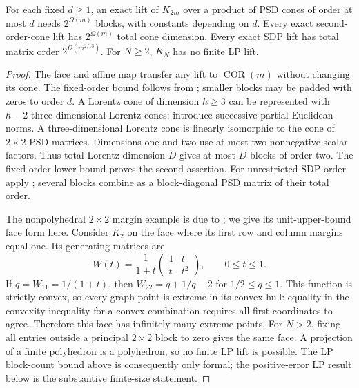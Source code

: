 \begin{corollary}\label{app:exact-conic}
For each fixed $d\ge1$, an exact lift of $K_{2m}$ over a product of
PSD cones of order at most $d$ needs $2^{\Omega(m)}$ blocks, with
constants depending on $d$. Every exact second-order-cone lift has
$2^{\Omega(m)}$ total cone dimension. Every exact SDP lift has total
matrix order $2^{\Omega(m^{2/13})}$. For $N\ge2$, $K_N$ has no finite
LP lift.
\end{corollary}
\begin{proof}
The face and affine map transfer any lift to $\operatorname{COR}(m)$
without changing its cone. The fixed-order bound follows from
\citet[Theorem~1]{s6:fawzi2013}; smaller blocks may be padded with
zeros to order $d$. A Lorentz cone of dimension $h\ge3$ can be
represented with $h-2$ three-dimensional Lorentz cones: introduce
successive partial Euclidean norms. A three-dimensional Lorentz cone
is linearly isomorphic to the cone of $2\times2$ PSD matrices.
Dimensions one and two use at most two nonnegative scalar factors.
Thus total Lorentz dimension $D$ gives at most $D$ blocks of order
two. The fixed-order lower bound proves the second assertion.
For unrestricted SDP order apply
\citet[Theorem~1.1]{s6:lrs-full}; several blocks combine as a
block-diagonal PSD matrix of their total order.

The nonpolyhedral $2\times2$ margin example is due to
\citet[Theorem~4 and Appendix~A.3, Proposition~12]
{dey2020-convexifications-of-rank-one-based}; we give its unit-upper-bound
face form here. Consider $K_2$ on the face where its first row
and column margins equal one. Its generating matrices are
\[
 W(t)=\frac1{1+t}\begin{pmatrix}1&t\\t&t^2\end{pmatrix},
 \qquad 0\le t\le1.
\]
If $q=W_{11}=1/(1+t)$, then $W_{22}=q+1/q-2$ for
$1/2\le q\le1$. This function is strictly convex, so every graph
point is extreme in its convex hull: equality in the convexity
inequality for a convex combination requires all first coordinates
to agree. Therefore this face has infinitely many extreme points.
For $N>2$, fixing all entries outside a principal $2\times2$ block
to zero gives the same face. A projection of a finite polyhedron is
a polyhedron, so no finite LP lift is possible. The LP block-count
bound above is consequently only formal; the positive-error LP result
below is the substantive finite-size statement.
\end{proof}

